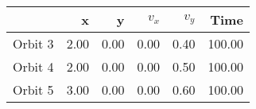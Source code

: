 \begin{tabular}{lrrrrr}
\toprule
{} &    x &    y &  $v_x$ &  $v_y$ &   Time \\
\midrule
Orbit 3 & 2.00 & 0.00 &   0.00 &   0.40 & 100.00 \\
Orbit 4 & 2.00 & 0.00 &   0.00 &   0.50 & 100.00 \\
Orbit 5 & 3.00 & 0.00 &   0.00 &   0.60 & 100.00 \\
\bottomrule
\end{tabular}

